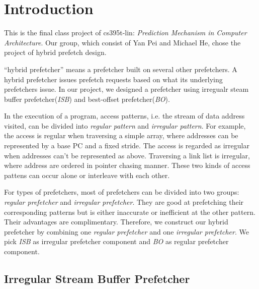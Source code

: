 \section{Introduction}
\label{sec:intro}

This is the final class project of cs395t-lin: \emph{Prediction Mechanism in Computer Architecture}. Our group, which consist of Yan Pei and Michael He, chose the project of hybrid prefetch design.

``hybrid prefetcher'' means a prefetcher built on several other prefetchers. A hybrid prefetcher issues prefetch requests based on what its underlying prefetchers issue. In our project, we designed a prefetcher using irregualr steam buffer prefetcher(\emph{ISB})\cite{isbpaper} and best-offset prefetcher(\emph{BO})\cite{bopaper}.

In the execution of a program, access patterns, i.e. the stream of data address visited, can be divided into \emph{regular pattern} and \emph{irregular pattern}. For example, the access is regular when traversing a simple array, where addresses can be represented by a base PC and a fixed stride. The access is regarded as irregular when addresses can't be represented as above.  Traversing a link list is irregular, where address are ordered in pointer chasing manner. These two kinds of access pattens can occur alone or interleave with each other.

For types of prefetchers, most of prefetchers can be divided into two groups: \emph{regular prefetcher}\cite{bopaper, sandboxpaper} and \emph{irregular prefetcher}\cite{isbpaper, ghbpaper, reinforcementlearning}.
They are good at prefetching their corresponding patterns but is either inaccurate or inefficient at the other pattern. Their advantages are complimentary.
Therefore, we construct our hybrid prefetcher by combining one \emph{regular prefetcher} and one \emph{irregular prefetcher}.
We pick \emph{ISB}\cite{isbpaper} as irregular prefetcher component and \emph{BO}\cite{bopaper} as regular prefetcher component.

  \subsection{Irregular Stream Buffer Prefetcher}
  \label{sec:isbintro}

